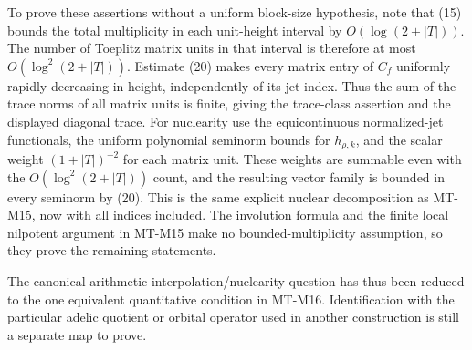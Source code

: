 To prove these assertions without a uniform block-size
hypothesis, note that (15) bounds the total multiplicity
in each unit-height interval by $O(\log(2+|T|))$.
The number of Toeplitz matrix units in that interval is
therefore at most $O(\log^2(2+|T|))$.
Estimate (20) makes every matrix entry of $C_f$ uniformly
rapidly decreasing in height, independently of its jet
index. Thus the sum of the trace norms of all matrix
units is finite, giving the trace-class assertion and
the displayed diagonal trace. For nuclearity use the
equicontinuous normalized-jet functionals, the uniform
polynomial seminorm bounds for $h_{\rho,k}$, and the
scalar weight $(1+|T|)^{-2}$ for each matrix unit.
These weights are summable even with the
$O(\log^2(2+|T|))$ count, and the resulting vector
family is bounded in every seminorm by (20).
This is the same explicit nuclear decomposition as
MT-M15, now with all indices included.
The involution formula and the finite local nilpotent
argument in MT-M15 make no bounded-multiplicity
assumption, so they prove the remaining statements.

The canonical arithmetic interpolation/nuclearity question
has thus been reduced to the one equivalent quantitative
condition in MT-M16. Identification with the particular
adelic quotient or orbital operator used in another
construction is still a separate map to prove.
